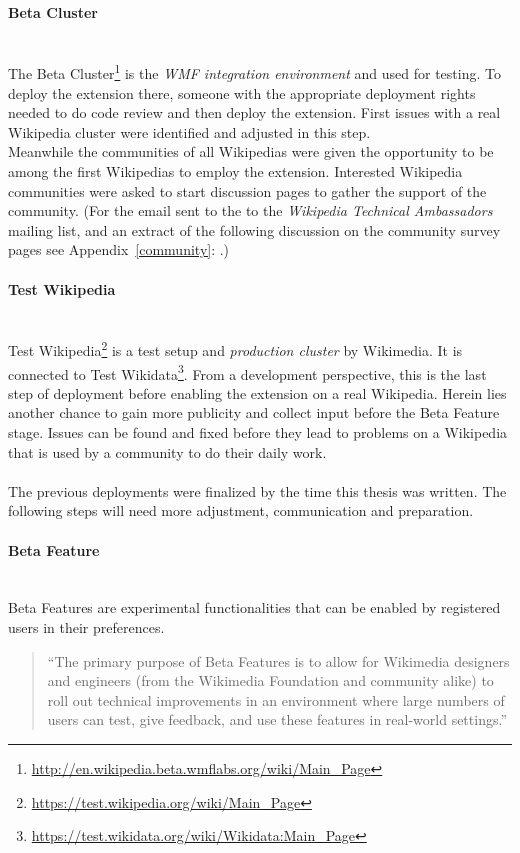 \paragraph{Beta Cluster} ~\\
The Beta Cluster\footnote{\url{http://en.wikipedia.beta.wmflabs.org/wiki/Main_Page}} is the \textit{WMF integration environment} and used for testing. To deploy the extension there, someone with the appropriate deployment rights needed to do code review and then deploy the extension. First issues with a real Wikipedia cluster were identified and adjusted in this step. \\
Meanwhile the communities of all Wikipedias were given the opportunity to be among the first Wikipedias to employ the extension. Interested Wikipedia communities were asked to start discussion pages to gather the support of the community. (For the email sent to the to the \textit{Wikipedia Technical Ambassadors} mailing list, and an extract of the following discussion on the community survey pages see Appendix~\ref{community}: .)

\paragraph{Test Wikipedia} ~\\
Test Wikipedia\footnote{\url{https://test.wikipedia.org/wiki/Main_Page}} is a test setup and \textit{production cluster} by Wikimedia. It is connected to Test Wikidata\footnote{\url{https://test.wikidata.org/wiki/Wikidata:Main_Page}}. From a development perspective, this is the last step of deployment before enabling the extension on a real Wikipedia. Herein lies another chance to gain more publicity and collect input before the Beta Feature stage. Issues can be found and fixed before they lead to problems on a Wikipedia that is used by a community to do their daily work. \\
\\
The previous deployments were finalized by the time this thesis was written. The following steps will need more adjustment, communication and preparation.

\paragraph{Beta Feature} ~\\
Beta Features are experimental functionalities that can be enabled by registered users in their preferences. 
\begin{quotation}
\noindent``The primary purpose of Beta Features is to allow for Wikimedia designers and engineers (from the Wikimedia Foundation and community alike) to roll out technical improvements in an environment where large numbers of users can test, give feedback, and use these features in real-world settings.'' \citep{wiki:04}
\end{quotation} 

